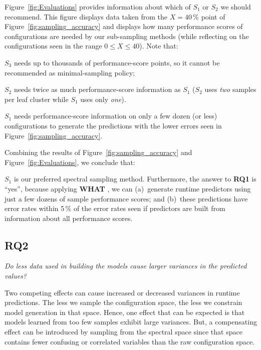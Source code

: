 \documentclass{newsig}
\newcommand{\fig}[1]{Figure~\ref{fig:#1}}
\newcommand{\what}{{\bf WHAT }}
\begin{document}
\fig{Evaluations} provides information about which  of    $S_1$ or $S_2$ we should recommend.
This figure displays data taken from the $X=40$\,\% point of \fig{sampling_accuracy} and displays
how many performance scores of configurations are needed by our sub-sampling methods (while
reflecting on the configurations seen in the range $0\le X \le 40$). Note that:
\begin{compactitem}
\item
$S_3$ needs up to thousands of performance-score points, 
so it cannot be recommended as minimal-sampling policy;
\item $S_2$ needs twice as much performance-score information as 
$S_1$ ($S_2$ uses {\em two} samples per leaf cluster  while
$S_1$ uses only {\em one}).
\item $S_1$ needs performance-score information on only a few dozen (or less) configurations to generate
the predictions with the lower errors seen in \fig{sampling_accuracy}.
\end{compactitem}
Combining the results of \fig{sampling_accuracy} and \fig{Evaluations}, we conclude that:

\begin{myshadowbox}
$S_1$ is our preferred spectral sampling method. Furthermore,
the answer to {\bf RQ1} is ``yes'', because applying \what{}, we can (a)~generate runtime predictors
using just a few dozens of sample performance scores; 
and (b)~these predictions have error rates
within 5\,\% of the error rates seen if predictors are built from information about all performance scores.
\end{myshadowbox}


\newpage

\subsection{RQ2}

\begin{center}
{\em
Do less data used in building the models cause larger variances in the predicted values?}
\end{center}


Two competing effects can cause increased or decreased  variances in 
runtime predictions.
The   less we sample the configuration space,
the less we constrain model generation in that space. Hence, one effect that can be expected
is that models learned
from too few samples exhibit large variances. 
But,
a  compensating effect can be introduced by sampling from the spectral space
since that space contains fewer confusing or correlated variables than the raw configuration space.
\end{document}

